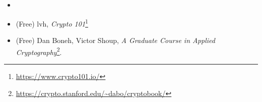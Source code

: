 \subsection{}
\label{crypto_books}

\begin{itemize}
\item \Schneier{}

\item (Free) lvh, \emph{Crypto 101}\footnote{\AlsoAvailableAs \url{https://www.crypto101.io/}}

\item (Free) Dan Boneh, Victor Shoup, \emph{A Graduate Course in Applied Cryptography}\footnote{\AlsoAvailableAs \url{https://crypto.stanford.edu/~dabo/cryptobook/}}.
\end{itemize}

